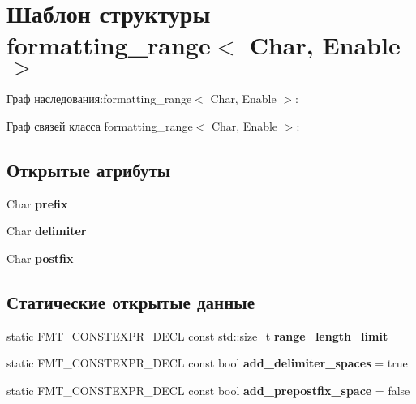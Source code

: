 \hypertarget{structformatting__range}{}\section{Шаблон структуры formatting\+\_\+range$<$ Char, Enable $>$}
\label{structformatting__range}


Граф наследования\+:formatting\+\_\+range$<$ Char, Enable $>$\+:


Граф связей класса formatting\+\_\+range$<$ Char, Enable $>$\+:
\subsection*{Открытые атрибуты}
\begin{DoxyCompactItemize}
\item 
\mbox{\label{structformatting__range_ada7fe968f694ec53469019303193c91c}} 
Char {\bfseries prefix}
\item 
\mbox{\label{structformatting__range_ace2ff20a7fa6d9425f1e099f543f2290}} 
Char {\bfseries delimiter}
\item 
\mbox{\label{structformatting__range_a91b4ee512cbb81d6020a33e2d8fec001}} 
Char {\bfseries postfix}
\end{DoxyCompactItemize}
\subsection*{Статические открытые данные}
\begin{DoxyCompactItemize}
\item 
static F\+M\+T\+\_\+\+C\+O\+N\+S\+T\+E\+X\+P\+R\+\_\+\+D\+E\+CL const std\+::size\+\_\+t {\bfseries range\+\_\+length\+\_\+limit}
\item 
\mbox{\label{structformatting__range_ad007def7b6d911c6076864fc79f5fa54}} 
static F\+M\+T\+\_\+\+C\+O\+N\+S\+T\+E\+X\+P\+R\+\_\+\+D\+E\+CL const bool {\bfseries add\+\_\+delimiter\+\_\+spaces} = true
\item 
\mbox{\label{structformatting__range_afde3ac851d6b0a020fb03d477f3a77b5}} 
static F\+M\+T\+\_\+\+C\+O\+N\+S\+T\+E\+X\+P\+R\+\_\+\+D\+E\+CL const bool {\bfseries add\+\_\+prepostfix\+\_\+space} = false
\end{DoxyCompactItemize}
